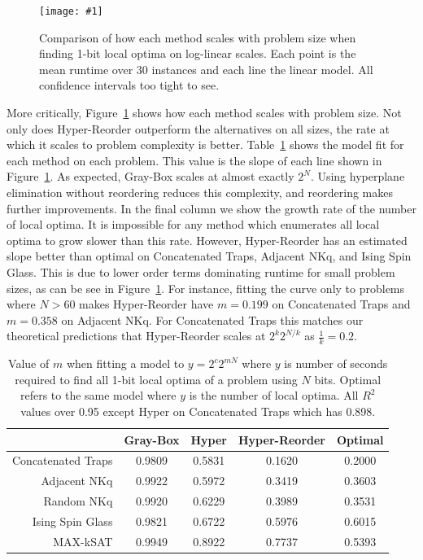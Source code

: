 \documentclass[runningheads,a4paper]{llncs}
\newcommand{\includegraphicsfit}[1]
{\texttt{[image: \#1]}}
\begin{document}
\begin{figure}
  \centering
  \includegraphicsfit{length-method}
  \caption{Comparison of how each method scales with problem size when finding 1-bit local optima
           on log-linear scales. Each point is the mean
           runtime over 30 instances and each line the linear model. All confidence intervals too tight to see.}
  \label{fig-length-method}
\end{figure}


More critically, Figure~\ref{fig-length-method} shows how each method scales with problem size.
Not only does Hyper-Reorder outperform the alternatives on all sizes, the rate at which it
scales to problem complexity is better. Table~\ref{table-scaling} shows the model fit for each
method on each problem. This value is the slope of each line shown in Figure~\ref{fig-length-method}.
As expected, Gray-Box scales at almost exactly $2^N$. Using hyperplane elimination without
reordering reduces this complexity, and reordering makes further improvements. In the final
column we show the growth rate of the number of local optima. It is impossible for any method
which enumerates all local optima to grow slower than this rate.
However, Hyper-Reorder has an estimated slope better than optimal on Concatenated Traps, Adjacent
NKq, and Ising Spin Glass.
This is
due to lower order terms dominating runtime for small problem sizes, as can be see in
Figure~\ref{fig-length-method}. For instance, fitting
the curve only to problems where $N>60$ makes Hyper-Reorder have $m=0.199$ on Concatenated Traps and
$m=0.358$ on Adjacent NKq. For Concatenated Traps this matches our theoretical predictions that
Hyper-Reorder scales at $2^k2^{N/k}$ as $\frac{1}{k}=0.2$.

\begin{table}
	\centering
	\caption{Value of $m$ when fitting a model to $y = 2^c2^{mN}$ where $y$ is number of seconds required to
	         find all 1-bit local optima of a problem using $N$ bits. Optimal refers to the same model where
	         $y$ is the number of local optima. All $R^2$ values over 0.95 except Hyper on Concatenated Traps
	         which has 0.898.}
	\begin{tabular}{|r|c|c|c|c|}
	  \hline
	    & \textbf{Gray-Box} & \textbf{Hyper} & \textbf{Hyper-Reorder} & \textbf{Optimal} \\ \hline
    Concatenated Traps & 0.9809 & 0.5831 & 0.1620 & 0.2000 \\ \hline
    Adjacent NKq & 0.9922 & 0.5972 & 0.3419 & 0.3603 \\ \hline
    Random NKq & 0.9920 & 0.6229 & 0.3989 & 0.3531 \\ \hline
    Ising Spin Glass & 0.9821 & 0.6722 & 0.5976 & 0.6015 \\ \hline
    MAX-kSAT & 0.9949 & 0.8922 & 0.7737 & 0.5393 \\ \hline
  \end{tabular}
  \label{table-scaling}
\end{table}
\end{document}
